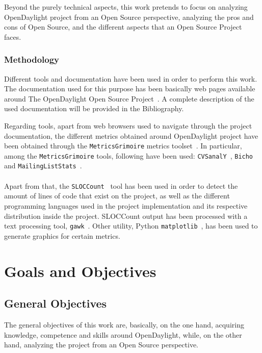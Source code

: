 \documentclass[a4paper, 12pt]{book}
\begin{document}
Beyond the purely technical aspects, this work pretends to focus on analyzing OpenDaylight project from an Open Source perspective, analyzing the pros and cons of Open Source, and the different aspects that an Open Source Project faces.

\subsection{Methodology}
\label{subsec:methodology}

Different tools and documentation have been used in order to perform this work. The documentation used for this purpose has been basically web pages available around The OpenDaylight Open Source Project~\cite{OpenDaylight}. A complete description of the used documentation will be provided in the Bibliography.

Regarding tools, apart from web browsers used to navigate through the project documentation, the different metrics obtained around OpenDaylight project have been obtained through the \texttt{MetricsGrimoire} metrics toolset~\cite{MetricsGrimoire}. In particular, among the \texttt{MetricsGrimoire} tools, following have been used: \texttt{CVSanalY}~\cite{CVSAnalY}, \texttt{Bicho}~\cite{Bicho} and \texttt{MailingListStats}~\cite{MailStats}.\\
\\
Apart from that, the \texttt{SLOCCount}~\cite{SLOCCount} tool has been used in order to detect the amount of lines of code that exist on the project, as well as the different programming languages used in the project implementation and its respective distribution inside the project. SLOCCount output has been processed with a text processing tool, \texttt{gawk}~\cite{GAWK}. Other utility, Python \texttt{matplotlib}~\cite{PyMatplotlib}, has been used to generate graphics for certain metrics.

\chapter{Goals and Objectives}
\label{chap:Goals}
\section{General Objectives}
\label{sec:genobj}


The general objectives of this work are, basically, on the one hand, acquiring knowledge, competence and skills around OpenDaylight, while, on the other hand, analyzing the project from an Open Source perspective.
\end{document}
